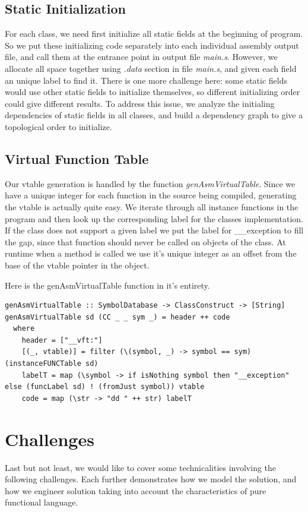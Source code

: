 \documentclass[12pt,letterpaper]{article}
\begin{document}
\subsection{Static Initialization}
For each class, we need first initialize all static fields at the beginning of program.
So we put these initializing code separately into each individual assembly output file, and call them at the entrance point in output file \emph{main.s}.
However, we allocate all space together using \emph{.data} section in file \emph{main.s}, and given each field an unique label to find it.
There is one more challenge here: some static fields would use other static fields to initialize themselves, so different initializing order could give different results.
To address this issue, we analyze the initialing dependencies of static fields in all classes, and build a dependency graph to give a topological order to initialize.

\subsection{Virtual Function Table}
Our vtable generation is handled by the function \emph{genAsmVirtualTable}.
Since we have a unique integer for each function in the source being compiled, generating the vtable is actually quite easy.
We iterate through all instance functions in the program and then look up the corresponding label for the classes implementation.
If the class does not support a given label we put the label for \_\_exception to fill the gap, since that function should never be called on objects of the class.
At runtime when a method is called we use it's unique integer as an offset from the base of the vtable pointer in the object.

Here is the genAsmVirtualTable function in it's entirety.
\begin{lstlisting}
genAsmVirtualTable :: SymbolDatabase -> ClassConstruct -> [String]
genAsmVirtualTable sd (CC _ _ sym _) = header ++ code
  where
    header = ["__vft:"]
    [(_, vtable)] = filter (\(symbol, _) -> symbol == sym) (instanceFUNCTable sd)
    labelT = map (\symbol -> if isNothing symbol then "__exception" else (funcLabel sd) ! (fromJust symbol)) vtable
    code = map (\str -> "dd " ++ str) labelT
\end{lstlisting}

\section{Challenges}
Last but not least, we would like to cover some technicalities involving the following challenges. Each further demonstrates how we model the solution, and how we engineer solution taking into account the characteristics of pure functional language.
\end{document}
